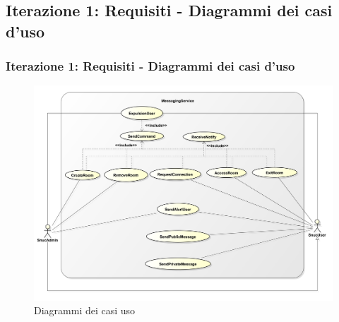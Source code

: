 \subsection{Iterazione 1: Requisiti - Diagrammi dei casi d'uso}
\begin{frame}
  \frametitle{Iterazione 1: Requisiti - Diagrammi dei casi d'uso}
   \begin{figure}[h]
    \includegraphics[scale=0.142]{image_astah/UseCaseDiagram.png}{\centering}
    \caption{Diagrammi dei casi uso} 
    \label{fig_UCD}
   \end{figure}
\end{frame}

